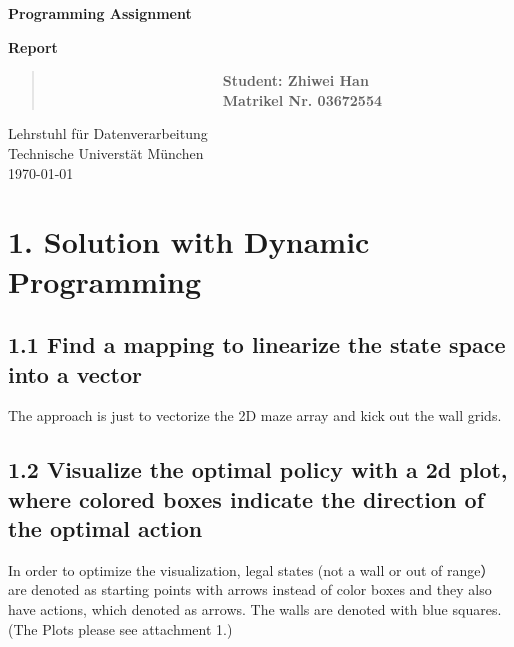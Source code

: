 \documentclass[12pt,a4paper,titlepage]{article}
\begin{document}
\begin{titlepage}
    \begin{center}
        \vspace*{3.5cm}
        
        \textbf{\huge{Programming Assignment}}
        \vspace{1cm}

        \textbf{\huge{Report}}

        \vspace{6cm}

        \begin{verse}
            \ \ \ \ \ \ \ \ \ \ \ \ \ \ \ \ \ \ \ \ \ \ \ \ \ \textbf{\large{Student: Zhiwei Han}}\\
            \ \ \ \ \ \ \ \ \ \ \ \ \ \ \ \ \ \ \ \ \ \ \ \ \ \textbf{\large{Matrikel Nr. 03672554
            }}\\
        \end{verse}


        
        \vspace{1cm}
        
        
        Lehrstuhl f\"ur Datenverarbeitung\\
        Technische Universt\"at M\"unchen\\
        \today
        
    \end{center}
\end{titlepage}



\setlength{\parindent}{0pt} \setlength{\parskip}{2ex plus 0.5ex
minus 0.2ex}


\section*{1. Solution with Dynamic Programming}
\subsection*{1.1 Find a mapping to linearize the state space into a vector}
The approach is just to vectorize the 2D maze array and kick out the wall grids.
\subsection*{1.2 Visualize the optimal policy with a 2d plot, where colored boxes indicate the direction of the optimal action}
In order to optimize the visualization, legal states (not a wall or out of range）are denoted as starting points with arrows instead of color boxes and they also have actions, which denoted as arrows. The walls are denoted with blue squares.\\
(The Plots please see attachment 1.)
\end{document}
